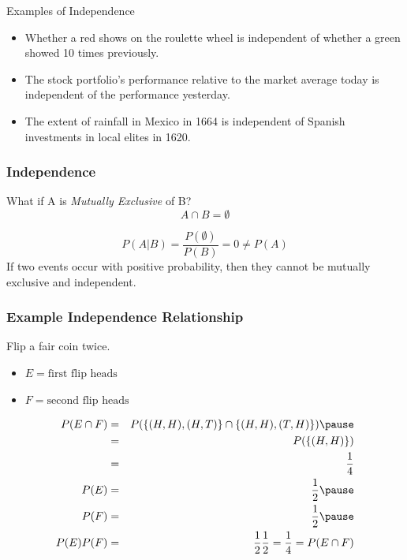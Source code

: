 \documentclass{beamer}
\numberwithin{equation}{section}
\begin{document}
\begin{frame}{Examples of Independence}

\begin{itemize}
\item Whether a red shows on the roulette wheel is independent of whether a green showed 10 times previously.\pause
\item The stock portfolio's performance relative to the market average today is independent of the performance yesterday.\pause
\item The extent of rainfall in Mexico in 1664 is independent of Spanish investments in local elites in 1620. 
\end{itemize}
\end{frame}


\begin{frame}
\frametitle{Independence}
What if A is \emph{Mutually Exclusive} of B?\pause
 $$A\cap B=\emptyset$$\pause
 
  $$P(A|B)=\frac{P(\emptyset)}{P(B)}=0\neq P(A)$$
 \pause
 If two events occur with positive probability, then they cannot be mutually exclusive and independent.
 \end{frame}




\begin{frame}
\frametitle{Example Independence Relationship}

Flip a fair coin twice.  
\begin{itemize}
\item[] $E = \text{first flip heads} $
\item[] $F = \text{second flip heads} $
\end{itemize}\pause
\begin{eqnarray}
P(E \cap F ) & = & P( \{ (H, H) , (H, T) \} \cap \{ (H, H), (T, H) \} ) \nonumber \pause \\
 & =& P( \{(H, H)\} ) \nonumber \\ 
 & = & \frac{1}{4} \nonumber \\
P(E ) & = & \frac{1} {2} \nonumber \pause \\
P(F) & = & \frac{1}{2} \nonumber \pause \\
P(E)P(F)  & =& \frac{1}{2}\frac{1}{2} = \frac{1}{4}  =P(E \cap F )  \nonumber 
 \end{eqnarray} 
 
 

\end{frame}
\end{document}
